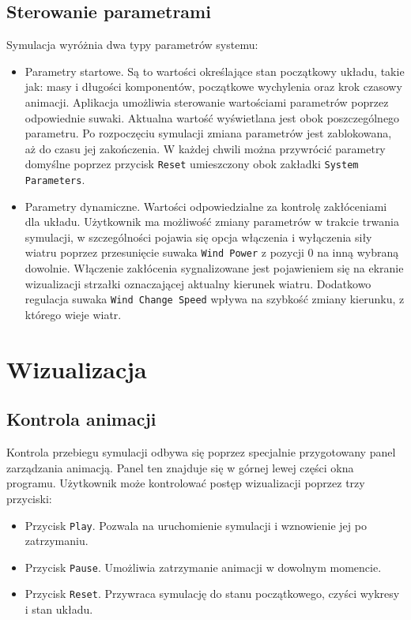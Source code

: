 \documentclass[12pt, twoside, openany]{report}
\theoremstyle{definition}
\begin{document}
\subsection{Sterowanie parametrami}
Symulacja wyróżnia dwa typy parametrów systemu:
\begin{itemize}
\item Parametry startowe. Są to wartości określające stan początkowy układu, takie jak: masy i długości komponentów, początkowe wychylenia oraz krok czasowy animacji. Aplikacja umożliwia sterowanie wartościami parametrów poprzez odpowiednie suwaki. Aktualna wartość wyświetlana jest obok poszczególnego parametru. Po rozpoczęciu symulacji zmiana parametrów jest zablokowana, aż do czasu jej zakończenia. W każdej chwili można przywrócić parametry domyślne poprzez przycisk \texttt{Reset} umieszczony obok zakładki \texttt{System Parameters}.
\item Parametry dynamiczne. Wartości odpowiedzialne za kontrolę zakłóceniami dla układu. Użytkownik ma możliwość zmiany parametrów w trakcie trwania symulacji, w szczególności pojawia się opcja włączenia i wyłączenia siły wiatru poprzez przesunięcie suwaka \texttt{Wind Power} z pozycji 0 na inną wybraną dowolnie. Włączenie zakłócenia sygnalizowane jest pojawieniem się na ekranie wizualizacji strzałki oznaczającej aktualny kierunek wiatru. Dodatkowo regulacja suwaka \texttt{Wind Change Speed} wpływa na szybkość zmiany kierunku, z którego wieje wiatr.
\end{itemize}

\section{Wizualizacja}
\subsection{Kontrola animacji}
Kontrola przebiegu symulacji odbywa się poprzez specjalnie przygotowany panel zarządzania animacją. Panel ten znajduje się w górnej lewej części okna programu. Użytkownik może kontrolować postęp wizualizacji poprzez trzy przyciski:
\begin{itemize}
\item Przycisk \texttt{Play}. Pozwala na uruchomienie symulacji i wznowienie jej po zatrzymaniu.
\item Przycisk \texttt{Pause}. Umożliwia zatrzymanie animacji w dowolnym momencie.
\item Przycisk \texttt{Reset}. Przywraca symulację do stanu początkowego, czyści wykresy i stan układu.
\end{itemize}
\end{document}
